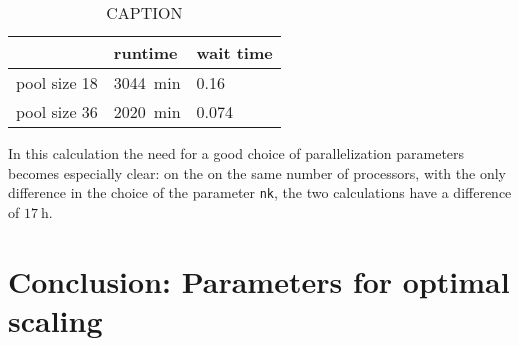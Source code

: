 \documentclass[main.tex]{subfiles}
\begin{document}
\begin{table}[ht!]
    \caption{CAPTION}
    \begin{tabular}{@{}lll@{}}
    \toprule
                 & runtime            & wait time \\ \midrule
    pool size 18 & \SI{3044}{\minute} & 0.16         \\
    pool size 36 & \SI{2020}{\minute} & 0.074
    \end{tabular}
    \label{tab:tas2_cdw_phonon_times}
\end{table}
In this calculation the need for a good choice of parallelization parameters becomes especially clear:
on the on the same number of processors, with the only difference in the choice of the parameter \texttt{nk}, the two calculations have a difference of \(\SI{17}{\hour}\).

\section{Conclusion: Parameters for optimal scaling}
\end{document}
